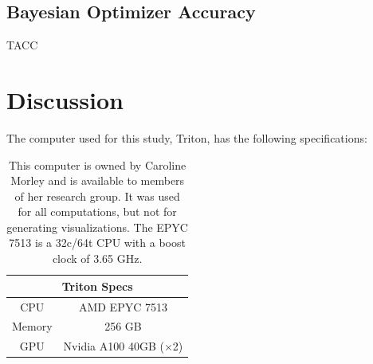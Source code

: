 \documentclass[twocolumn]{aastex631}
\begin{document}
\subsection{Bayesian Optimizer Accuracy}
TACC

\section{Discussion}
The computer used for this study, Triton, has the following specifications:
\begin{table}[h!]
    \hspace*{0.6cm}\begin{tabular}{|c|c|}
        \hline
        \multicolumn{2}{|c|}{\textbf{Triton Specs}}\\
        \hline\hline
        CPU & AMD EPYC 7513\\
        Memory & 256 GB\\
        GPU & Nvidia A100 40GB ($\times$2)\\
        \hline
    \end{tabular}
    \caption{This computer is owned by Caroline Morley and is available to
    members of her research group. It was used for all computations, but not 
    for generating visualizations. The EPYC 7513 is a 32c/64t CPU with a 
    boost clock of 3.65 GHz.}
\end{table}
\end{document}
